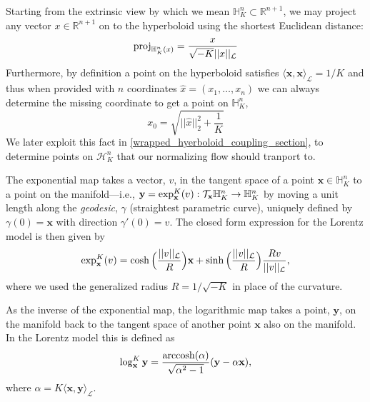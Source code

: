 Starting from the extrinsic view by which we mean $\mathbb{H}^{n}_K \subset \mathbb{R}^{n+1}$, we may project any vector $x \in \mathbb{R}^{n+1}$ on to the hyperboloid using the shortest Euclidean distance:
\begin{equation}
    \textnormal{proj}_{\mathbb{H}^{n}_K(x)} = \frac{x}{\sqrt{-K}||x||_{\mathcal{L}}}
\end{equation}
Furthermore, by definition a point on the hyperboloid satisfies $\langle \textbf{x}, \textbf{x} \rangle_{\mathcal{L}} = 1/K$ and thus when provided with $n$ coordinates $\hat{x} = (x_1, \dots, x_{n})$ we can always determine the missing coordinate to get a point on $\mathbb{H}^n_K$,
\begin{equation}
    \label{eqn:hyperboloid_projection}
    x_0 = \sqrt{||\hat{x}||^2_2 + \frac{1}{K}}
\end{equation}
We later exploit this fact in \ref{wrapped_hyerboloid_coupling_section}, to determine points on $\mathcal{H}^n_K$ that our normalizing flow should tranport to.

The exponential map takes a vector, $v$, in the tangent space of a point $\textbf{x} \in \mathbb{H}^{n}_K$ to a point on the manifold---i.e., $\textbf{y} = \textnormal{exp}^K_\textbf{x}(v): \mathcal{T}_{\textbf{x}} \mathbb{H}^{n}_K \to \mathbb{H}^{n}_K$ by moving a unit length along the \textit{geodesic}, $\gamma$ (straightest parametric curve), uniquely defined by $\gamma(0) = \textbf{x}$ with direction $\gamma '(0)= v$. The closed form expression for the Lorentz model is then given by
\begin{equation}
    \textnormal{exp}^K_{\textbf{x}} (v) = \cosh \Big(\frac{||v||_{\mathcal{L}}}{R} \Big)\textbf{x} +  \sinh \Big(\frac{||v||_{\mathcal{L}}}{R} \Big)\frac{Rv}{||{v}||_{\mathcal{L}}},
\end{equation}
where we used the generalized radius $R = 1/\sqrt{-K}$ in place of the curvature.

As the inverse of the exponential map, the logarithmic map takes a point, $\textbf{y}$, on the manifold back to the tangent space of another point $\textbf{x}$ also on the manifold. In the Lorentz model this is defined as
\begin{equation}
    \log^K_{\textbf{x}}{\textbf{y}} = \frac{\operatorname{arccosh}(\alpha)}{\sqrt{\alpha^2 - 1}}(\textbf{y} - \alpha \textbf{x}),
\end{equation}
where $\alpha = K\langle \textbf{x}, \textbf{y} \rangle_{\mathcal{L}}$.

